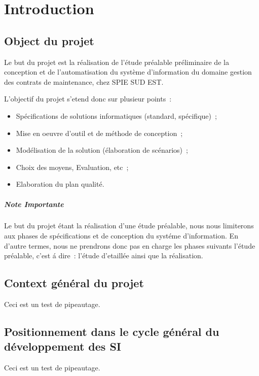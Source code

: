 \chapter{Introduction}

\section{Object du projet}

Le but du projet est la r\'ealisation de l’\'etude pr\'ealable pr\'eliminaire de la conception et de
l’automatisation du syst\`eme d’information du domaine gestion des contrats de maintenance, chez SPIE SUD EST.

L'objectif du projet s'etend donc sur plusieur points~:
\begin{itemize}
    \item Sp\'ecifications de solutions informatiques (standard, sp\'ecifique)~;
    \item Mise en oeuvre d’outil et de m\'ethode de conception~;
    \item Mod\'elisation de la solution (\'elaboration de sc\'enarios)~;
    \item Choix des moyens, Evaluation, etc~;
    \item Elaboration du plan qualit\'e.
\end{itemize}

\paragraph{Note Importante} Le but du projet \'etant la r\'ealisation  d'une \'etude pr\'ealable, nous nous
limiterons aux phases de sp\'ecifications et de conception du syst\'eme d’information. En d'autre termes,
nous ne prendrons donc pas en charge les phases suivants l’\'etude pr\'ealable, c’est \'a dire~:
l’\'etude d'etaill\'ee ainsi que la r\'ealisation.


\section{Context g\'en\'eral du projet}

Ceci est un test de pipeautage.


\section{Positionnement dans le cycle g\'en\'eral du d\'eveloppement des SI}

Ceci est un test de pipeautage.
